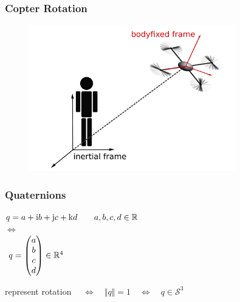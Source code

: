 
\begin{frame}
	\frametitle{Copter Rotation}
		\begin{figure}[p]
			\centering
			\includegraphics[width=0.8\textwidth]{images/Koordinatensysteme.pdf}
			\label{fig:Koordinatensysteme}
	\end{figure}
\end{frame}


\begin{frame}
	\frametitle{Quaternions}
	\begin{block}{}
		\centering
		\( q = a + \textup{i}b+\textup{j}c+\textup{k}d \qquad a, b, c, d \in \mathbb{R} \) \\
		\vspace{.5ex}
		\(\Leftrightarrow\) \\
		\vspace{1ex}
		\( \hspace{1ex} q = \begin{pmatrix} a \\ b \\ c\\ d \end{pmatrix} \in \mathbb{R}^4 \)
	\end{block}
	
	\vspace{1em}
			 \centering
			represent rotation \( \quad \Leftrightarrow \quad \Vert q \Vert = 1 \quad \Leftrightarrow \quad q \in \mathcal{S}^3\) 
\end{frame}


